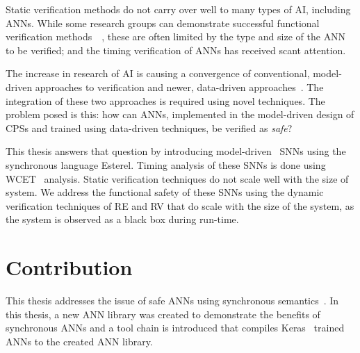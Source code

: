 Static verification methods do not carry over well to many types of \ac{AI}, including \acp{ANN}.
While some research groups can demonstrate successful functional verification methods~\cite{Gehr2018AI2SA}~\cite{reluplex}, these are often limited by the type and size of the \ac{ANN} to be verified; and the timing verification of \acp{ANN} has received scant attention.

The increase in research of \ac{AI} is causing a convergence of conventional, model-driven approaches to verification and newer, data-driven approaches~\cite{dmd2019}.
The integration of these two approaches is required using novel techniques.
The problem posed is this: how can \acp{ANN}, implemented in the model-driven design of \acp{CPS} and trained using data-driven techniques, be verified as \textit{safe}?

This thesis answers that question by introducing model-driven~\cite{dmd2019} \acfp{SNN} using the synchronous language Esterel.
Timing analysis of these \acp{SNN} is done using \acf{WCET}~\cite{wang2017timing} analysis.
Static verification techniques do not scale well with the size of system.
We address the functional safety of these \acp{SNN} using the dynamic verification techniques of \acf{RE} and \acf{RV} that do scale with the size of the system, as the system is observed as a black box during run-time.

\section{Contribution}
This thesis addresses the issue of safe \acp{ANN} using synchronous semantics~\cite{berry1991}.
In this thesis, a new \ac{ANN} library was created to demonstrate the benefits of synchronous \acp{ANN} and a tool chain is introduced that compiles Keras~\cite{chollet2015keras} trained \acp{ANN} to the created \ac{ANN} library.

